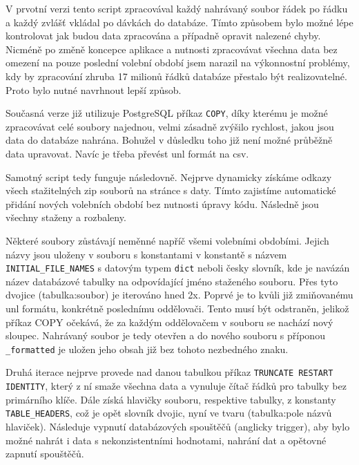 \par V prvotní verzi tento script zpracovával každý nahrávaný soubor řádek po řádku a každý zvlášť vkládal po dávkách do databáze. Tímto způsobem bylo možné lépe kontrolovat jak budou data zpracována a případně opravit nalezené chyby. Nicméně po změně koncepce aplikace a nutnosti zpracovávat všechna data bez omezení na pouze poslední volební období jsem narazil na výkonnostní problémy, kdy by zpracování zhruba 17 milionů řádků databáze přestalo být realizovatelné.
Proto bylo nutné navrhnout lepší způsob.

\par Současná verze již utilizuje PostgreSQL příkaz \texttt{COPY}, díky kterému je možné zpracovávat celé soubory najednou\cite{psql-copy}, velmi zásadně zvýšilo rychlost, jakou jsou data do databáze nahrána. Bohužel v důsledku toho již není možné průběžně data upravovat. Navíc je třeba převést unl formát na csv.

\par Samotný script tedy funguje následovně. Nejprve dynamicky získáme odkazy všech stažitelných zip souborů na stránce s daty. Tímto zajistíme automatické přidání nových volebních období bez nutnosti úpravy kódu. Následně jsou všechny staženy a rozbaleny. 
\par Některé soubory zůstávají neměnné napříč všemi volebními obdobími. Jejich názvy jsou uloženy v souboru s konstantami v konstantě s názvem \texttt{INITIAL\_FILE\_NAMES} s datovým typem \texttt{dict} neboli česky slovník, kde je navázán název databázové tabulky na odpovídající jméno staženého souboru. Přes tyto dvojice (tabulka:soubor) je iterováno hned 2x. Poprvé je to kvůli již zmiňovanému unl formátu, konkrétně poslednímu oddělovači. Tento musí být odstraněn, jelikož příkaz COPY očekává, že za každým oddělovačem v souboru se nachází nový sloupec. Nahrávaný soubor je tedy otevřen a do nového souboru s příponou \texttt{\_formatted} je uložen jeho obsah již bez tohoto nezbedného znaku.
\par Druhá iterace nejprve provede nad danou tabulkou příkaz \texttt{TRUNCATE RESTART IDENTITY}, který z ní smaže všechna data a vynuluje čítač řádků pro tabulky bez primárního klíče\cite{psql-truncate}. Dále získá hlavičky souboru, respektive tabulky, z konstanty \texttt{TABLE\_HEADERS}, což je opět slovník dvojic, nyní ve tvaru (tabulka:pole názvů hlaviček). Následuje vypnutí databázových spouštěčů (anglicky trigger), aby bylo možné nahrát i data s nekonzistentními hodnotami, nahrání dat a opětovné zapnutí spouštěčů. 


